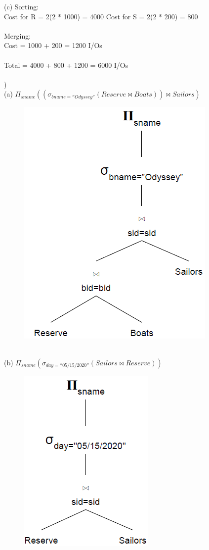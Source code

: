\documentclass[12pt]{article}
\begin{document}
\indent (c) Sorting:\\
\indent \indent Cost for R = 2(2 * 1000) = 4000 \indent \indent Cost for S = 2(2 * 200) = 800\\\\
\indent \indent Merging:\\
\indent \indent Cost = 1000 + 200 = 1200 I/Os\\\\
\indent \indent Total = 4000 + 800 + 1200 = 6000 I/Os\\


\hrulefill\\


)\\
\indent \indent (a) {\large $\Pi_{sname}((\sigma_{bname=''Odyssey''}(Reserve \bowtie Boats)) \bowtie Sailors )$} 
\begin{figure}[h!]
  \centering
  \includegraphics[scale=.6]{Q2a.PNG}
\end{figure}\\


\indent \indent (b) {\large $\Pi_{sname}(\sigma_{day=''05/15/2020''}(Sailors \bowtie Reserve))$} 
\begin{figure}[h!]
  \centering
  \includegraphics[scale=.6]{Q2b.PNG}
\end{figure}
\end{document}
